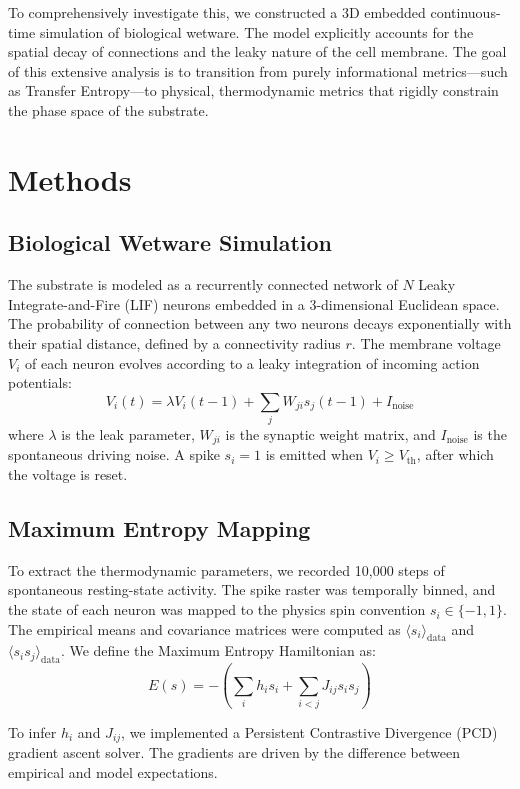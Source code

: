 \documentclass[11pt,a4paper]{article}
\begin{document}
To comprehensively investigate this, we constructed a 3D embedded continuous-time simulation of biological wetware. The model explicitly accounts for the spatial decay of connections and the leaky nature of the cell membrane. The goal of this extensive analysis is to transition from purely informational metrics—such as Transfer Entropy—to physical, thermodynamic metrics that rigidly constrain the phase space of the substrate.


\section{Methods}
\subsection{Biological Wetware Simulation}
The substrate is modeled as a recurrently connected network of $N$ Leaky Integrate-and-Fire (LIF) neurons embedded in a 3-dimensional Euclidean space. The probability of connection between any two neurons decays exponentially with their spatial distance, defined by a connectivity radius $r$. The membrane voltage $V_i$ of each neuron evolves according to a leaky integration of incoming action potentials:
\begin{equation}
    V_i(t) = \lambda V_i(t-1) + \sum_{j} W_{ji} s_j(t-1) + I_{\text{noise}}
\end{equation}
where $\lambda$ is the leak parameter, $W_{ji}$ is the synaptic weight matrix, and $I_{\text{noise}}$ is the spontaneous driving noise. A spike $s_i=1$ is emitted when $V_i \ge V_{\text{th}}$, after which the voltage is reset.

\subsection{Maximum Entropy Mapping}
To extract the thermodynamic parameters, we recorded 10,000 steps of spontaneous resting-state activity. The spike raster was temporally binned, and the state of each neuron was mapped to the physics spin convention $s_i \in \{-1, 1\}$. 
The empirical means and covariance matrices were computed as $\langle s_i \rangle_{\text{data}}$ and $\langle s_i s_j \rangle_{\text{data}}$. We define the Maximum Entropy Hamiltonian as:
\begin{equation}
    E(s) = -\left(\sum_i h_i s_i + \sum_{i < j} J_{ij} s_i s_j\right)
\end{equation}

To infer $h_i$ and $J_{ij}$, we implemented a Persistent Contrastive Divergence (PCD) gradient ascent solver. The gradients are driven by the difference between empirical and model expectations.
\end{document}
